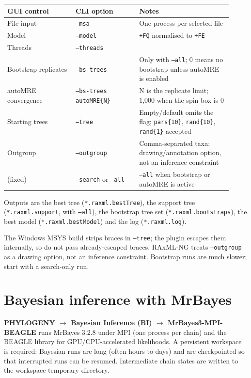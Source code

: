 \documentclass[10pt]{report}
\begin{document}
\begin{longtable}{@{}>{\raggedright\arraybackslash}p{0.28\linewidth}
                      >{\raggedright\arraybackslash}p{0.26\linewidth}
                      >{\raggedright\arraybackslash}p{0.38\linewidth}@{}}
\toprule
GUI control & CLI option & Notes \\
\midrule
\endhead
File input & \texttt{--msa} & One process per selected file \\
Model & \texttt{--model} & \texttt{+FQ} normalised to \texttt{+FE} \\
Threads & \texttt{--threads} & \\
Bootstrap replicates & \texttt{--bs-trees} & Only with \texttt{--all}; 0 means
no bootstrap unless autoMRE is enabled \\
autoMRE convergence & \texttt{--bs-trees autoMRE\{N\}} & N is the replicate
limit; 1{,}000 when the spin box is 0 \\
Starting trees & \texttt{--tree} & Empty/default omits the flag;
\texttt{pars\{10\}}, \texttt{rand\{10\}}, \texttt{rand\{1\}} accepted \\
Outgroup & \texttt{--outgroup} & Comma-separated taxa; drawing/annotation
option, not an inference constraint \\
(fixed) & \texttt{--search} or \texttt{--all} & \texttt{--all} when bootstrap
or autoMRE is active \\
\bottomrule
\end{longtable}

Outputs are the best tree (\texttt{*.raxml.bestTree}), the support tree
(\texttt{*.raxml.support}, with \texttt{--all}), the bootstrap tree set
(\texttt{*.raxml.bootstraps}), the best model (\texttt{*.raxml.bestModel}) and
the log (\texttt{*.raxml.log}).

\begin{warning}
The Windows MSYS build strips braces in \texttt{--tree}; the plugin escapes
them internally, so do not pass already-escaped braces. RAxML-NG treats
\texttt{--outgroup} as a drawing option, not an inference constraint.
Bootstrap runs are much slower; start with a search-only run.
\end{warning}

\section{Bayesian inference with MrBayes}

\textbf{PHYLOGENY $\rightarrow$ Bayesian Inference (BI) $\rightarrow$
MrBayes3-MPI-BEAGLE} runs MrBayes 3.2.8 \cite{mrbayes} under MPI (one process
per chain) and the BEAGLE library for GPU/CPU-accelerated likelihoods. A persistent workspace
is required: Bayesian runs are long (often hours to days) and are checkpointed
so that interrupted runs can be resumed. Intermediate chain states are written
to the workspace temporary directory.
\end{document}
